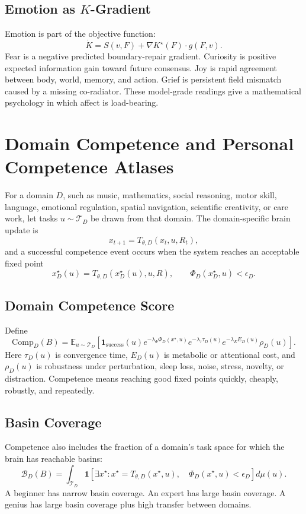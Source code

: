\documentclass[11pt]{article}
\theoremstyle{remark}
\theoremstyle{plain}
\newcommand{\E}{\mathbb E}
\begin{document}
\subsection[Emotion as K-Gradient]{Emotion as \(K\)-Gradient}

Emotion is part of the objective function:
\[
\dot K
=
S(v,F)+\nabla K^\star(F)\cdot g(F,v).
\]
Fear is a negative predicted boundary-repair gradient. Curiosity is positive expected information gain toward future consensus. Joy is rapid agreement between body, world, memory, and action. Grief is persistent field mismatch caused by a missing co-radiator. These model-grade readings give a mathematical psychology in which affect is load-bearing.

\section{Domain Competence and Personal Competence Atlases}

For a domain \(D\), such as music, mathematics, social reasoning, motor skill, language, emotional regulation, spatial navigation, scientific creativity, or care work, let tasks \(u\sim\mathcal T_D\) be drawn from that domain. The domain-specific brain update is
\[
x_{t+1}=T_{\theta,D}(x_t,u,R_t),
\]
and a successful competence event occurs when the system reaches an acceptable fixed point
\[
x^\star_D(u)=T_{\theta,D}(x^\star_D(u),u,R),
\qquad
\Phi_D(x^\star_D,u)<\epsilon_D.
\]

\subsection{Domain Competence Score}

Define
\[
\boxed{
\mathrm{Comp}_D(B)
=
\E_{u\sim\mathcal T_D}
\left[
\mathbf 1_{\mathrm{success}}(u)
e^{-\lambda_\Phi \Phi_D(x^\star,u)}
e^{-\lambda_\tau \tau_D(u)}
e^{-\lambda_E E_D(u)}
\rho_D(u)
\right].
}
\]
Here \(\tau_D(u)\) is convergence time, \(E_D(u)\) is metabolic or attentional cost, and \(\rho_D(u)\) is robustness under perturbation, sleep loss, noise, stress, novelty, or distraction. Competence means reaching good fixed points quickly, cheaply, robustly, and repeatedly.

\subsection{Basin Coverage}

Competence also includes the fraction of a domain's task space for which the brain has reachable basins:
\[
\boxed{
\mathcal B_D(B)
=
\int_{\mathcal T_D}
\mathbf 1
\left[
\exists x^\star:
x^\star=T_{\theta,D}(x^\star,u),\quad
\Phi_D(x^\star,u)<\epsilon_D
\right]
d\mu(u).
}
\]
A beginner has narrow basin coverage. An expert has large basin coverage. A genius has large basin coverage plus high transfer between domains.
\end{document}
